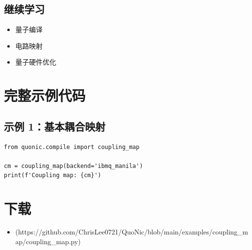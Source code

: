 \documentclass[12pt,a4paper]{article}
\begin{document}
\subsection{继续学习}
\begin{itemize}
  \item 量子编译
  \item 电路映射
  \item 量子硬件优化
\end{itemize}

\section{完整示例代码}

\subsection{示例 1：基本耦合映射}

\begin{verbatim}
from quonic.compile import coupling_map

cm = coupling_map(backend='ibmq_manila')
print(f'Coupling map: {cm}')
\end{verbatim}

\section{下载}

\begin{itemize}
  \item [coupling\_map.py](https://github.com/ChrisLee0721/QuoNic/blob/main/examples/coupling_map/coupling_map.py)
\end{itemize}
\end{document}
